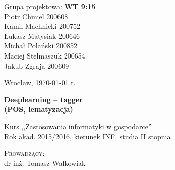 \noindent
\begin{minipage}[t]{.5\linewidth}
	\begin{flushleft}
		Grupa projektowa: \tabto{3.5cm}\textbf{WT 9:15}\\
		\vspace{0.8cm}
		Piotr Chmiel \tabto{3.5cm}200608\\
		Kamil Machnicki \tabto{3.5cm}200752\\
		Łukasz Matysiak \tabto{3.5cm}200646\\
		Michał Polański \tabto{3.5cm}200852\\
		Maciej Stelmaszuk \tabto{3.5cm}200654\\
		Jakub Zgraja \tabto{3.5cm}200609\\
	\end{flushleft} 
\end{minipage}%
\begin{minipage}[t]{.5\linewidth}
	\begin{flushright}
		Wrocław, {\today} r.\\
		\vspace{.35cm}

	\end{flushright}
\end{minipage}

\vspace{3.0cm}

\begin{center}
	{\Huge\bf Deeplearning -- tagger}\\
	{\Large\bf (POS, lematyzacja)}\\
		
\end{center}

\begin{center}
	{\large Kurs ,,Zastosowania informatyki w gospodarce''}\\
	{\large Rok akad. 2015/2016, kierunek INF, studia II stopnia}
\end{center}

\vspace{2cm}
\begin{center}
		\textsc{Prowadzący:}\\
		dr inż. Tomasz Walkowiak
\end{center}
